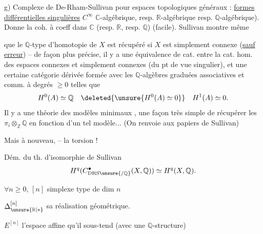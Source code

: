 g) Complexe de De-Rham-Sullivan pour espaces topologiques généraux : \uline{formes différentielles singulières} $C^\infty$  $\mathbb C$-algébrique, resp. $\mathbb R$-algébrique resp. $\mathbb Q$-algébrique). Donne la coh. à coeff dans $\mathbb C$ (resp. $\mathbb R$, resp. $\mathbb Q$) (facile). Sullivan montre même

que le $\mathbb Q$-type d'homotopie de $X$ est récupéré si $X$ est simplement connexe (\uline{sauf erreur}) -- de façon plus précise, il y a une équivalence de cat.  entre la cat. hom.  des espaces connexes et simplement connexes (du pt de vue singulier), et une certaine catégorie dérivée formée avec les $\mathbb Q$-algèbres graduées associatives et  comm.  à degrés $\geq 0$ telles que
\[
H^0(A)\simeq\mathbb Q\quad \deleted{\unsure{H^0(A)\simeq0}}\quad H^1(A)\simeq0.
\]
Il y a une théorie des modèles minimaux , une façon très simple de récupérer les $\pi_i\otimes_{\mathbb Z}\mathbb Q$ en fonction d'un tel modèle... (On renvoie aux papiers de Sullivan)

Mais à nouveau, --  la torsion !


Dém. du th. d'isomorphie de Sullivan
\[
H^q(C^\bullet_{\mathrm{DRS}\unsure{/\mathbb Q}}(X,\mathbb Q))\simeq H^q(X,\mathbb Q).
\]

$\forall n\geq0$, $[n]$ simplexe type de dim $n$

$\Delta^{[n]}_{\unsure{\mathbb R|*}}$ sa réalisation géométrique.

$E^{[n]}$ l'espace affine qu'il sous-tend (avec une $\mathbb Q$-structure)

